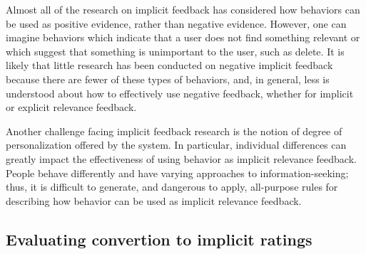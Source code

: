 Almost all of the research on implicit feedback has considered how behaviors can
be used as positive evidence, rather than negative evidence. However, one can imagine
behaviors which indicate that a user does not find something relevant or which suggest
that something is unimportant to the user, such as delete. It is likely that little research
has been conducted on negative implicit feedback because there are fewer of these types
of behaviors, and, in general, less is understood about how to effectively use negative
feedback, whether for implicit or explicit relevance feedback.

Another challenge facing implicit feedback research is the notion of degree of
personalization offered by the system. In particular, individual differences can greatly
impact the effectiveness of using behavior as implicit relevance feedback. People behave
differently and have varying approaches to information-seeking; thus, it is difficult to
generate, and dangerous to apply, all-purpose rules for describing how behavior can be
used as implicit relevance feedback.

\subsection{Evaluating convertion to implicit ratings}

